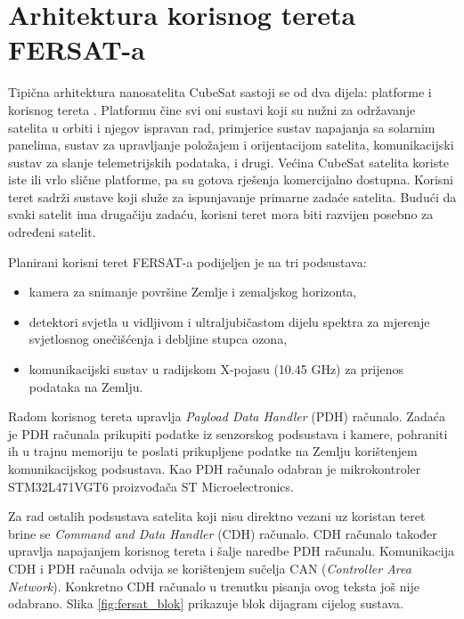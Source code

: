 \chapter{Arhitektura korisnog tereta FERSAT-a} \label{chapter:arhitektura}

Tipična arhitektura nanosatelita CubeSat sastoji se od dva dijela: platforme  i korisnog tereta . Platformu čine svi oni sustavi koji su nužni za održavanje satelita u orbiti i njegov ispravan rad, primjerice sustav napajanja sa solarnim panelima, sustav za upravljanje položajem i orijentacijom satelita, komunikacijski sustav za slanje telemetrijskih podataka, i drugi. Većina CubeSat satelita koriste iste ili vrlo slične platforme, pa su gotova rješenja komercijalno dostupna. Korisni teret sadrži sustave koji služe za ispunjavanje primarne zadaće satelita. Budući da svaki satelit ima drugačiju zadaću, korisni teret mora biti razvijen posebno za određeni satelit.

Planirani korisni teret  FERSAT-a podijeljen je na tri podsustava:

\begin{itemize}
    \item kamera za snimanje površine Zemlje i zemaljskog horizonta,
    \item detektori svjetla u vidljivom i ultraljubičastom dijelu spektra za mjerenje svjetlosnog onečišćenja i debljine stupca ozona,
    \item komunikacijski sustav u radijskom X-pojasu (10.45 GHz) za prijenos podataka na Zemlju.
\end{itemize}

Radom korisnog tereta upravlja \textit{Payload Data Handler} (PDH) računalo. Zadaća je PDH računala prikupiti podatke iz senzorskog podsustava i kamere, pohraniti ih u trajnu memoriju  te poslati prikupljene podatke na Zemlju korištenjem komunikacijskog podsustava. Kao PDH računalo odabran je mikrokontroler STM32L471VGT6 proizvođača ST Microelectronics.

Za rad ostalih podsustava satelita koji nisu direktno vezani uz koristan teret brine se \textit{Command and Data Handler} (CDH) računalo. CDH računalo također upravlja napajanjem korisnog tereta i šalje naredbe PDH računalu. Komunikacija CDH i PDH računala odvija se korištenjem sučelja CAN (\textit{Controller Area Network}). Konkretno CDH računalo u trenutku pisanja ovog teksta još nije odabrano. Slika \ref{fig:fersat_blok} prikazuje blok dijagram cijelog sustava.

